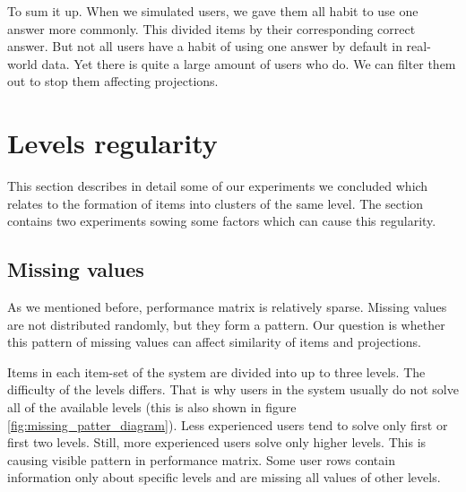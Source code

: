 \documentclass[
  digital, %
  table,   %
  nolof,     %
  nolot,     %
  nocover,
  color,
  final, %
]{fithesis3}
\begin{document}

To sum it up. When we simulated users, we gave them all habit to use one answer more commonly. This divided items by their corresponding correct answer. But not all users have a habit of using one answer by default in real-world data. Yet there is quite a large amount of users who do. We can filter them out to stop them affecting projections.


\section{Levels regularity}\label{evaulation-levels-regularity}

This section describes in detail some of our experiments we concluded which relates to the formation of items into clusters of the same level. The section contains two experiments sowing some factors which can cause this regularity.


\subsection{Missing values}\label{missing-values}


As we mentioned before, performance matrix is relatively sparse. Missing values are not distributed randomly, but they form a pattern. Our question is whether this pattern of missing values can affect similarity of items and projections.


Items in each item-set of the system are divided into up to three levels. The difficulty of the levels differs. That is why users in the system usually do not solve all of the available levels (this is also shown in figure \ref{fig:missing_patter_diagram}). Less experienced users tend to solve only first or first two levels. Still, more experienced users solve only higher levels. This is causing visible pattern in performance matrix. Some user rows contain information only about specific levels and are missing all values of other levels.
\end{document}
